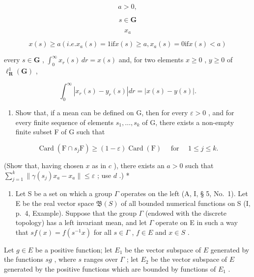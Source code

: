 \[
a > 0,
\]

\[
s \in \mathbf {G}
\]

\[
x _ {a}
\]

\[
x (s) \geqslant a (i. e. x _ {a} (s) = 1 \text {if} x (s) \geqslant a, x _ {a} (s) = 0 \text {if} x (s) <   a)
\]

every \(s \in \mathbf{G}\) , \(\int_{0}^{\infty} x_r(s) \, dr = x(s)\) and, for two elements \(x \geqslant 0\) , \(y \geqslant 0\) of \(\ell_{\mathbf{R}}^{1}(\mathbf{G})\) ,

\[
\int_ {0} ^ {\infty} \left| x _ {r} (s) - y _ {r} (s) \right| d r = \left| x (s) - y (s) \right|.
\]

\begin{enumerate}
\def\labelenumi{\alph{enumi})}
\setcounter{enumi}{4}
\tightlist
\item
  Show that, if a mean can be defined on G, then for every \(\varepsilon > 0\) , and for every finite sequence of elements \(s_1, \ldots, s_k\) of G, there exists a non-empty finite subset F of G such that
\end{enumerate}

\[
\operatorname{Card} (\mathrm{F} \cap s _ {j} \mathrm{F}) \geqslant (1 - \varepsilon) \operatorname{Card} (\mathrm{F}) \quad \text { for } \quad 1 \leqslant j \leqslant k.
\]

(Show that, having chosen \(x\) as in \(c\) ), there exists an \(a > 0\) such that \(\sum_{j=1}^{k} \| \gamma(s_j) x_a - x_a \| \leqslant \varepsilon\) ; use \(d\) .) *

\begin{enumerate}
\def\labelenumi{\arabic{enumi})}
\setcounter{enumi}{5}
\tightlist
\item
  Let S be a set on which a group \(\Gamma\) operates on the left (A, I, § 5, No.~1). Let E be the real vector space \(\mathfrak{B}(S)\) of all bounded numerical functions on S (I, p.~4, Example). Suppose that the group \(\Gamma\) (endowed with the discrete topology) has a left invariant mean, and let \(\Gamma\) operate on E in such a way that \(sf(x) = f(s^{-1}x)\) for all \(s \in \Gamma\) , \(f \in E\) and \(x \in S\) .
\end{enumerate}

Let \(g \in E\) be a positive function; let \(E_1\) be the vector subspace of \(E\) generated by the functions \(sg\) , where \(s\) ranges over \(\Gamma\) ; let \(E_2\) be the vector subspace of \(E\) generated by the positive functions which are bounded by functions of \(E_1\) .

